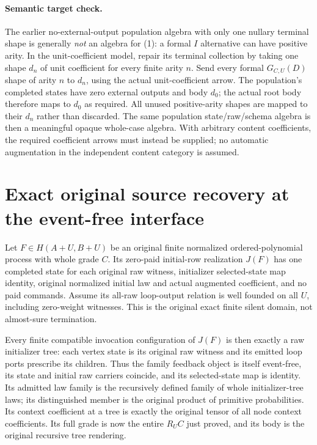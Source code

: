 \documentclass[11pt]{article}
\begin{document}
\paragraph{Semantic target check.} The earlier no-external-output population algebra with only one nullary terminal shape is generally \emph{not} an algebra for (1): a formal $I$ alternative can have positive arity. In the unit-coefficient model, repair its terminal collection by taking one shape $d_n$ of unit coefficient for every finite arity $n$. Send every formal $G_{C,U}(D)$ shape of arity $n$ to $d_n$, using the actual unit-coefficient arrow. The population's completed states have zero external outputs and body $d_0$; the actual root body therefore maps to $d_0$ as required. All unused positive-arity shapes are mapped to their $d_n$ rather than discarded. The same population state/raw/schema algebra is then a meaningful opaque whole-case algebra. With arbitrary content coefficients, the required coefficient arrows must instead be supplied; no automatic augmentation in the independent content category is assumed.

\section{Exact original source recovery at the event-free interface}
Let $F\in H(A+U,B+U)$ be an original finite normalized ordered-polynomial process with whole grade $C$. Its zero-paid initial-row realization $J(F)$ has one completed state for each original raw witness, initializer selected-state map identity, original normalized initial law and actual augmented coefficient, and no paid commands. Assume its all-raw loop-output relation is well founded on all $U$, including zero-weight witnesses. This is the original exact finite silent domain, not almost-sure termination.

Every finite compatible invocation configuration of $J(F)$ is then exactly a raw initializer tree: each vertex state is its original raw witness and its emitted loop ports prescribe its children. Thus the family feedback object is itself event-free, its state and initial raw carriers coincide, and its selected-state map is identity. Its admitted law family is the recursively defined family of whole initializer-tree laws; its distinguished member is the original product of primitive probabilities. Its context coefficient at a tree is exactly the original tensor of all node context coefficients. Its full grade is now the entire $R_UC$ just proved, and its body is the original recursive tree rendering.
\end{document}
